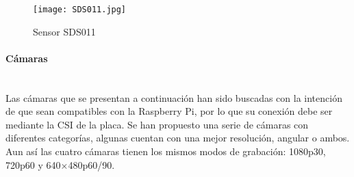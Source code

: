 \begin{figure}[H]
	\caption{Sensor SDS011}
	\texttt{[image: SDS011.jpg]}
\end{figure}
\endminipage\hfill
{}
\begin{table}[H]
	\centering
	\caption{Especificaciones módulo SDS011}
	\label{tab:sds011}
\end{table}
\endminipage

\pagebreak
\paragraph{Cámaras}\mbox{} \\
Las cámaras que se presentan a continuación han sido buscadas con la intención de que sean compatibles con la Raspberry Pi, por lo que su conexión debe ser mediante la CSI de la placa. Se han propuesto una serie de cámaras con diferentes categorías\cite{cholewiak_raspberry_2017}, algunas cuentan con una mejor resolución, angular o ambos. Aun así las cuatro cámaras tienen los mismos modos de grabación: 1080p30, 720p60 y 640×480p60/90.

